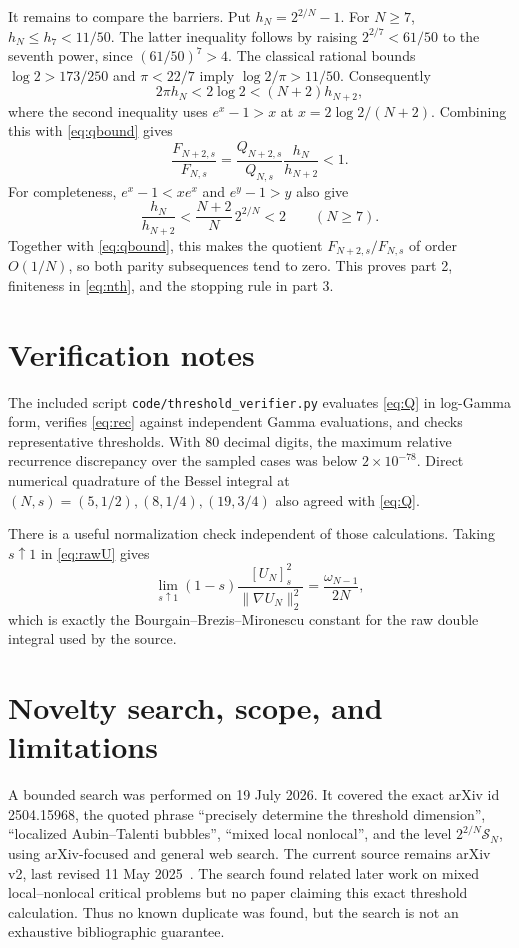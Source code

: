 \documentclass[11pt]{article}
\newcommand{\SN}{\mathcal{S}_N}
\begin{document}
It remains to compare the barriers. Put $h_N=2^{2/N}-1$. For $N\geq7$,
$h_N\leq h_7<11/50$. The latter inequality follows by raising
$2^{2/7}<61/50$ to the seventh power, since $(61/50)^7>4$.
The classical rational bounds $\log2>173/250$ and $\pi<22/7$ imply
$\log2/\pi>11/50$. Consequently
\[
 2\pi h_N<2\log2<(N+2)h_{N+2},
\]
where the second inequality uses $e^x-1>x$ at
$x=2\log2/(N+2)$. Combining this with \eqref{eq:qbound} gives
\[
 \frac{F_{N+2,s}}{F_{N,s}}
 =\frac{Q_{N+2,s}}{Q_{N,s}}\frac{h_N}{h_{N+2}}<1.
\]
For completeness, $e^x-1<xe^x$ and $e^y-1>y$ also give
\[
 \frac{h_N}{h_{N+2}}<\frac{N+2}{N}\,2^{2/N}<2
 \qquad(N\geq7).
\]
Together with \eqref{eq:qbound}, this makes the quotient
$F_{N+2,s}/F_{N,s}$ of order $O(1/N)$, so both parity subsequences tend to zero.
This proves part 2, finiteness in \eqref{eq:nth}, and the stopping rule in
part 3.

\section{Verification notes}

The included script \texttt{code/threshold\_verifier.py} evaluates
\eqref{eq:Q} in log-Gamma form, verifies \eqref{eq:rec} against independent
Gamma evaluations, and checks representative thresholds. With 80 decimal
digits, the maximum relative recurrence discrepancy over the sampled cases
was below $2\times10^{-78}$. Direct numerical quadrature of the Bessel
integral at $(N,s)=(5,1/2),(8,1/4),(19,3/4)$ also agreed with
\eqref{eq:Q}.

There is a useful normalization check independent of those calculations.
Taking $s\uparrow1$ in \eqref{eq:rawU} gives
\[
 \lim_{s\uparrow1}(1-s)\frac{[U_N]_s^2}{\|\nabla U_N\|_2^2}
 =\frac{\omega_{N-1}}{2N},
\]
which is exactly the Bourgain--Brezis--Mironescu constant for the raw double
integral used by the source.

\section{Novelty search, scope, and limitations}

A bounded search was performed on 19 July 2026. It covered the exact arXiv id
2504.15968, the quoted phrase ``precisely determine the threshold dimension'',
``localized Aubin--Talenti bubbles'', ``mixed local nonlocal'', and the level
$2^{2/N}\SN$, using arXiv-focused and general web search. The current source
remains arXiv v2, last revised 11 May 2025~\cite{source}. The search found
related later work on mixed local--nonlocal critical problems but no paper
claiming this exact threshold calculation. Thus no known duplicate was found,
but the search is not an exhaustive bibliographic guarantee.
\end{document}
